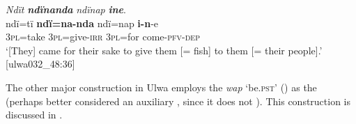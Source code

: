 \ea%
    \label{ex:pred:64}
          \textit{Ndït} \textbf{\textit{ndïnanda}} \textit{ndïnap} \textbf{\textit{ine}}.\\
\gll ndï=tï    \textbf{ndï=na-nda}  ndï=nap  \textbf{i-n}{}-e\\
    3\textsc{pl}=take  3\textsc{pl}=give-\textsc{irr}  3\textsc{pl=}for  come-\textsc{pfv-dep}\\
\glt `[They] came for their sake to give them [= fish] to them [= their people].’ [ulwa032\_48:36]
\z

  The other major  construction in Ulwa employs the  \textit{wap} ‘be.\textsc{pst}’ () as the  (perhaps better considered an auxiliary , since it does not ). This construction is discussed in .

